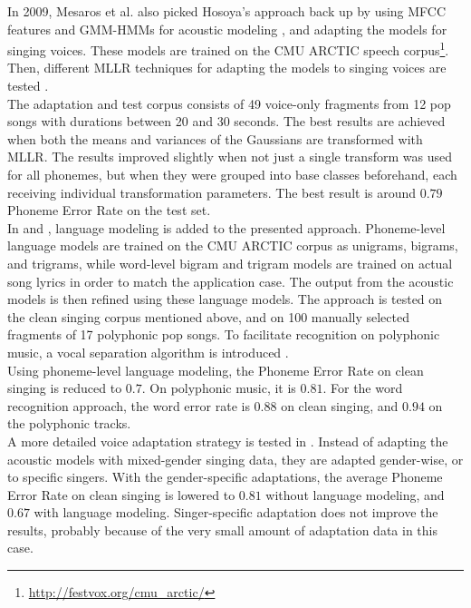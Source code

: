 In 2009, Mesaros et al. also picked Hosoya's approach back up by using MFCC features and GMM-HMMs for acoustic modeling \cite{Mesaros2009}, and adapting the models for singing voices. These models are trained on the CMU ARCTIC speech corpus\footnote{\url{http://festvox.org/cmu_arctic/}}. Then, different MLLR techniques for adapting the models to singing voices are tested \cite{mllr}.\\
The adaptation and test corpus consists of 49 voice-only fragments from 12 pop songs with durations between 20 and 30 seconds. The best results are achieved when both the means and variances of the Gaussians are transformed with MLLR. The results improved slightly when not just a single transform was used for all phonemes, but when they were grouped into base classes beforehand, each receiving individual transformation parameters. The best result is around $0.79$ Phoneme Error Rate on the test set.\\
In \cite{Mesaros2010} and \cite{Mesaros2011}, language modeling is added to the presented approach. Phoneme-level language models are trained on the CMU ARCTIC corpus as unigrams, bigrams, and trigrams, while word-level bigram and trigram models are trained on actual song lyrics in order to match the application case. The output from the acoustic models is then refined using these language models. The approach is tested on the clean singing corpus mentioned above, and on 100 manually selected fragments of 17 polyphonic pop songs. To facilitate recognition on polyphonic music, a vocal separation algorithm is introduced \cite{virtanen_separation}.\\
Using phoneme-level language modeling, the Phoneme Error Rate on clean singing is reduced to $0.7$. On polyphonic music, it is $0.81$. For the word recognition approach, the word error rate is $0.88$ on clean singing, and $0.94$ on the polyphonic tracks.\\
A more detailed voice adaptation strategy is tested in \cite{mesaros2}. Instead of adapting the acoustic models with mixed-gender singing data, they are adapted gender-wise, or to specific singers. With the gender-specific adaptations, the average Phoneme Error Rate on clean singing is lowered to $0.81$ without language modeling, and $0.67$ with language modeling. Singer-specific adaptation does not improve the results, probably because of the very small amount of adaptation data in this case.\\
